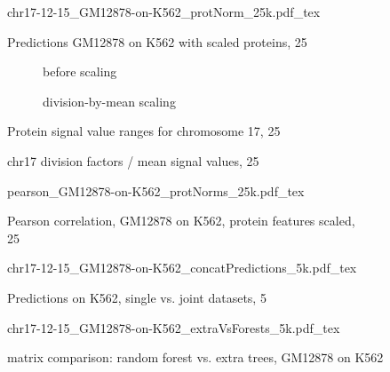 \begin{appendices}
\begin{figure}[hb]
 \centering
 \scriptsize
 {chr17-12-15_GM12878-on-K562_protNorm_25k.pdf_tex}
 \caption{Predictions GM12878 on K562 with scaled proteins, \SI{25}{\kilo\bp}}
 \label{fig:app:GM12878:K562:chr17:normalizedProteins:25k}
\end{figure}

\begin{figure}[hb]
 \centering
 \begin{subfigure}{0.495\textwidth}
 \centering
 \caption{before scaling}
 \label{fig:app:prots:valueRangeBefore}
\end{subfigure} \hfill
\begin{subfigure}{0.495\textwidth}
 \centering
 \caption{division-by-mean scaling}
 \label{fig:app:prots:valueRangeDivByMean}
 \end{subfigure}
 \caption{Protein signal value ranges for chromosome 17, \SI{25}{\kilo\bp}}
\end{figure}
\begin{figure}
 \centering
 \caption{chr17 division factors / mean signal values, \SI{25}{\kilo\bp}}
 \label{fig:app:prots:divByMeanFactors}
 \end{figure}

\begin{figure}[hb]
 \centering
 \scriptsize
 {pearson_GM12878-on-K562_protNorms_25k.pdf_tex}
 \caption{Pearson correlation, GM12878 on K562, protein features scaled, \SI{25}{\kilo\bp} }
 \label{fig:app:Pearson:GM12878:K562:chr17:protNorms:25kb}
\end{figure}

\begin{figure}[hb]
 \centering
 \scriptsize
 {chr17-12-15_GM12878-on-K562_concatPredictions_5k.pdf_tex}
 \caption{Predictions on K562, single vs. joint datasets, \SI{5}{\kilo\bp}}
 \label{fig:app:all:K562:chr17:singleVsJoint:5k}
\end{figure}

 \begin{figure}[hb]
 \centering
 \scriptsize
 {chr17-12-15_GM12878-on-K562_extraVsForests_5k.pdf_tex}
 \caption{matrix comparison: random forest vs. extra trees, GM12878 on K562}
 \label{fig:app:GM12878:K562:chr17:forestVsExtratrees}
\end{figure}


\end{appendices}
